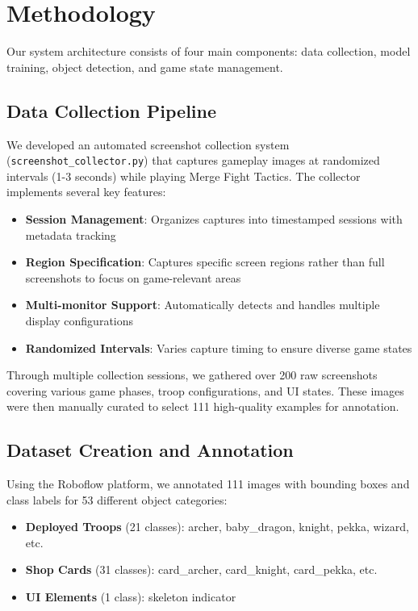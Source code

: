 \documentclass[12pt]{article}
\begin{document}
\section{Methodology}

Our system architecture consists of four main components: data collection, model training, object detection, and game state management.

\subsection{Data Collection Pipeline}

We developed an automated screenshot collection system (\texttt{screenshot\_collector.py}) that captures gameplay images at randomized intervals (1-3 seconds) while playing Merge Fight Tactics. The collector implements several key features:

\begin{itemize}
    \item \textbf{Session Management}: Organizes captures into timestamped sessions with metadata tracking
    \item \textbf{Region Specification}: Captures specific screen regions rather than full screenshots to focus on game-relevant areas
    \item \textbf{Multi-monitor Support}: Automatically detects and handles multiple display configurations
    \item \textbf{Randomized Intervals}: Varies capture timing to ensure diverse game states
\end{itemize}

Through multiple collection sessions, we gathered over 200 raw screenshots covering various game phases, troop configurations, and UI states. These images were then manually curated to select 111 high-quality examples for annotation.

\subsection{Dataset Creation and Annotation}

Using the Roboflow platform, we annotated 111 images with bounding boxes and class labels for 53 different object categories:

\begin{itemize}
    \item \textbf{Deployed Troops} (21 classes): archer, baby\_dragon, knight, pekka, wizard, etc.
    \item \textbf{Shop Cards} (31 classes): card\_archer, card\_knight, card\_pekka, etc.
    \item \textbf{UI Elements} (1 class): skeleton indicator
\end{itemize}
\end{document}
